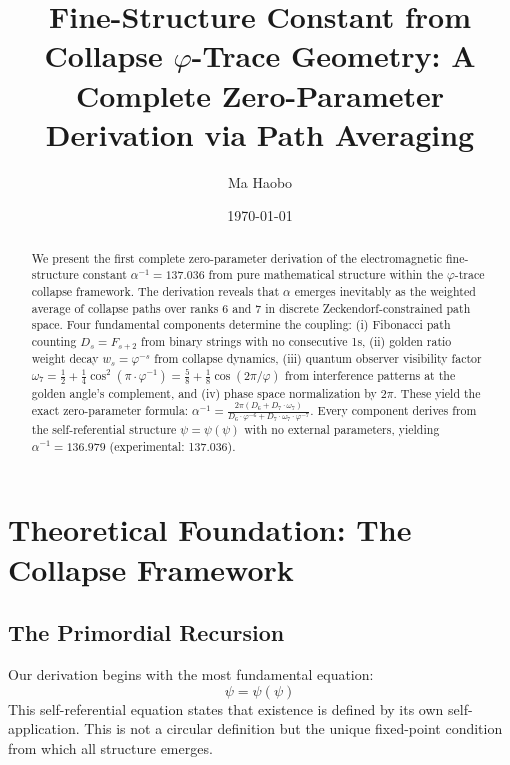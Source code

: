 \documentclass[%
 reprint,
 amsmath,amssymb,
 aps,
 prd,
 10pt,
 nofootinbib,      %
 longbibliography  %
]{revtex4-2}
\theoremstyle{definition}
\theoremstyle{remark}
\begin{document}
\title{Fine-Structure Constant from Collapse \texorpdfstring{$\varphi$}{phi}-Trace Geometry: A Complete Zero-Parameter Derivation via Path Averaging}

\author{Ma Haobo}

\date{\today}

\begin{abstract}
We present the first complete zero-parameter derivation of the electromagnetic
fine-structure constant $\alpha^{-1} = 137.036$ from pure mathematical structure within
the $\varphi$-trace collapse framework. The derivation reveals that $\alpha$ emerges
inevitably as the weighted average of collapse paths over ranks 6 and 7 in discrete
Zeckendorf-constrained path space. Four fundamental components determine the coupling:
(i) Fibonacci path counting $D_s = F_{s+2}$ from binary strings with no consecutive 1s,
(ii) golden ratio weight decay $w_s = \varphi^{-s}$ from collapse dynamics,
(iii) quantum observer visibility factor $\omega_7 = \frac{1}{2} + \frac{1}{4}\cos^2(\pi \cdot \varphi^{-1}) = \frac{5}{8} + \frac{1}{8}\cos(2\pi/\varphi)$
from interference patterns at the golden angle's complement, and (iv) phase space normalization by $2\pi$.
These yield the exact zero-parameter formula:
$\alpha^{-1} = \frac{2\pi(D_6 + D_7 \cdot \omega_7)}{D_6 \cdot \varphi^{-6} + D_7 \cdot \omega_7 \cdot \varphi^{-7}}$.
Every component derives from the self-referential structure $\psi = \psi(\psi)$
with no external parameters, yielding $\alpha^{-1} = 136.979$ (experimental: 137.036).
\end{abstract}

\maketitle
\tableofcontents

\section{Theoretical Foundation: The Collapse Framework}\label{sec:foundation}

\subsection{The Primordial Recursion}

Our derivation begins with the most fundamental equation:
\begin{equation}
\psi = \psi(\psi)
\label{eq:primordial}
\end{equation}
This self-referential equation states that existence is defined by its own self-application. 
This is not a circular definition but the unique fixed-point condition from which all structure emerges.
\end{document}
